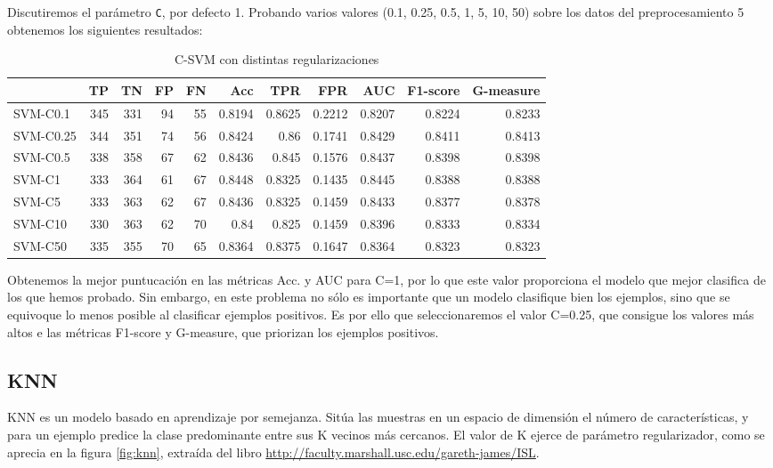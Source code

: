 \documentclass{article}
\begin{document}
Discutiremos el parámetro \texttt{C}, por defecto 1. Probando varios
valores (0.1, 0.25, 0.5, 1, 5, 10, 50) sobre los datos del
preprocesamiento 5 obtenemos los siguientes resultados:

\begin{table}[H]
\centering
\caption{C-SVM con distintas regularizaciones}
\label{tab:tuning-svm}
\begin{tabular}{|lrrrrrrrrrr|}
\hline
 & TP & TN & FP & FN & Acc & TPR & FPR & AUC & F1-score & G-measure\\ \hline
SVM-C0.1 & 345 & 331 & 94 & 55 & 0.8194 & 0.8625 & 0.2212 & 0.8207 & 0.8224 & 0.8233\\
SVM-C0.25 & 344 & 351 & 74 & 56 & 0.8424 & 0.86 & 0.1741 & 0.8429 & 0.8411 & 0.8413\\
SVM-C0.5 & 338 & 358 & 67 & 62 & 0.8436 & 0.845 & 0.1576 & 0.8437 & 0.8398 & 0.8398\\
SVM-C1 & 333 & 364 & 61 & 67 & 0.8448 & 0.8325 & 0.1435 & 0.8445 & 0.8388 & 0.8388\\
SVM-C5 & 333 & 363 & 62 & 67 & 0.8436 & 0.8325 & 0.1459 & 0.8433 & 0.8377 & 0.8378\\
SVM-C10 & 330 & 363 & 62 & 70 & 0.84 & 0.825 & 0.1459 & 0.8396 & 0.8333 & 0.8334\\
SVM-C50 & 335 & 355 & 70 & 65 & 0.8364 & 0.8375 & 0.1647 & 0.8364 & 0.8323 & 0.8323\\
\hline
\end{tabular}
\end{table}

Obtenemos la mejor puntucación en las métricas Acc. y AUC para C=1,
por lo que este valor proporciona el modelo que mejor clasifica de los
que hemos probado. Sin embargo, en este problema no sólo es importante
que un modelo clasifique bien los ejemplos, sino que se equivoque lo
menos posible al clasificar ejemplos positivos. Es por ello que
seleccionaremos el valor C=0.25, que consigue los valores más altos e
las métricas F1-score y G-measure, que priorizan los ejemplos
positivos.

\subsection{KNN}

KNN es un modelo basado en aprendizaje por semejanza. Sitúa las
muestras en un espacio de dimensión el número de características, y
para un ejemplo predice la clase predominante entre sus K vecinos más
cercanos. El valor de K ejerce de parámetro regularizador, como se
aprecia en la figura \ref{fig:knn}, extraída del libro
\href{http://faculty.marshall.usc.edu/gareth-james/ISL}{http://faculty.marshall.usc.edu/gareth-james/ISL}.
\end{document}
